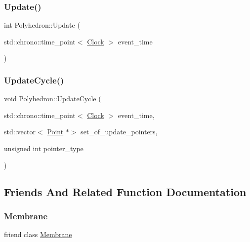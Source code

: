 \mbox{\label{classPolyhedron_a5fdc8c91719799904b8a1ccef535a42c}} 
\subsubsection{\texorpdfstring{Update()}{Update()}}
{\footnotesize\ttfamily int Polyhedron\+::\+Update (\begin{DoxyParamCaption}\item[{std\+::chrono\+::time\+\_\+point$<$ \mbox{\hyperlink{universe_8h_a0ef8d951d1ca5ab3cfaf7ab4c7a6fd80}{Clock}} $>$}]{event\+\_\+time }\end{DoxyParamCaption})}

\mbox{\label{classPolyhedron_a6b26174513703bc2b13f69b9cd8e1a48}} 
\subsubsection{\texorpdfstring{Update\+Cycle()}{UpdateCycle()}}
{\footnotesize\ttfamily void Polyhedron\+::\+Update\+Cycle (\begin{DoxyParamCaption}\item[{std\+::chrono\+::time\+\_\+point$<$ \mbox{\hyperlink{universe_8h_a0ef8d951d1ca5ab3cfaf7ab4c7a6fd80}{Clock}} $>$}]{event\+\_\+time,  }\item[{std\+::vector$<$ \mbox{\hyperlink{classPoint}{Point}} $\ast$$>$}]{set\+\_\+of\+\_\+update\+\_\+pointers,  }\item[{unsigned int}]{pointer\+\_\+type }\end{DoxyParamCaption})}



\subsection{Friends And Related Function Documentation}
\mbox{\label{classPolyhedron_ac790db405644a01723104c3c0c8128bb}} 
\subsubsection{\texorpdfstring{Membrane}{Membrane}}
{\footnotesize\ttfamily friend class \mbox{\hyperlink{classMembrane}{Membrane}}\hspace{0.3cm}{\ttfamily [friend]}}

